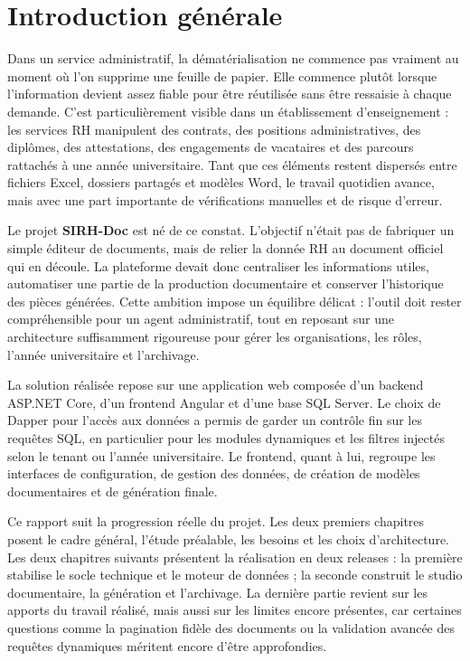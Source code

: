 \chapter*{Introduction générale}

Dans un service administratif, la dématérialisation ne commence pas vraiment au moment où l'on supprime une feuille de papier. Elle commence plutôt lorsque l'information devient assez fiable pour être réutilisée sans être ressaisie à chaque demande. C'est particulièrement visible dans un établissement d'enseignement : les services RH manipulent des contrats, des positions administratives, des diplômes, des attestations, des engagements de vacataires et des parcours rattachés à une année universitaire. Tant que ces éléments restent dispersés entre fichiers Excel, dossiers partagés et modèles Word, le travail quotidien avance, mais avec une part importante de vérifications manuelles et de risque d'erreur.

Le projet \textbf{SIRH-Doc} est né de ce constat. L'objectif n'était pas de fabriquer un simple éditeur de documents, mais de relier la donnée RH au document officiel qui en découle. La plateforme devait donc centraliser les informations utiles, automatiser une partie de la production documentaire et conserver l'historique des pièces générées. Cette ambition impose un équilibre délicat : l'outil doit rester compréhensible pour un agent administratif, tout en reposant sur une architecture suffisamment rigoureuse pour gérer les organisations, les rôles, l'année universitaire et l'archivage.

La solution réalisée repose sur une application web composée d'un backend ASP.NET Core, d'un frontend Angular et d'une base SQL Server. Le choix de Dapper pour l'accès aux données a permis de garder un contrôle fin sur les requêtes SQL, en particulier pour les modules dynamiques et les filtres injectés selon le tenant ou l'année universitaire. Le frontend, quant à lui, regroupe les interfaces de configuration, de gestion des données, de création de modèles documentaires et de génération finale.

Ce rapport suit la progression réelle du projet. Les deux premiers chapitres posent le cadre général, l'étude préalable, les besoins et les choix d'architecture. Les deux chapitres suivants présentent la réalisation en deux releases : la première stabilise le socle technique et le moteur de données ; la seconde construit le studio documentaire, la génération et l'archivage. La dernière partie revient sur les apports du travail réalisé, mais aussi sur les limites encore présentes, car certaines questions comme la pagination fidèle des documents ou la validation avancée des requêtes dynamiques méritent encore d'être approfondies.
